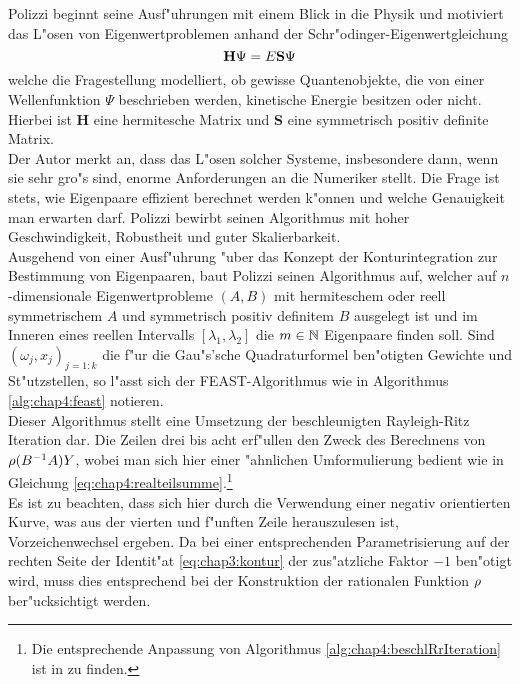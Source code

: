 Polizzi beginnt seine Ausf"uhrungen mit einem Blick in die Physik und motiviert das L"osen von Eigenwertproblemen anhand der Schr"odinger-Eigenwertgleichung
\[
\textbf{\text{H}}\Psi = E\textbf{\text{S}}\Psi
\]
welche die Fragestellung modelliert, ob gewisse Quantenobjekte, die von einer Wellenfunktion $\Psi$ beschrieben werden, kinetische Energie besitzen oder nicht. Hierbei ist \textbf{H} eine hermitesche Matrix und \textbf{S} eine symmetrisch positiv definite Matrix.\\

Der Autor merkt an, dass das L"osen solcher Systeme, insbesondere dann, wenn sie sehr gro"s sind, enorme Anforderungen an die Numeriker stellt. Die Frage ist stets, wie Eigenpaare effizient berechnet werden k"onnen und welche Genauigkeit man erwarten darf. Polizzi bewirbt seinen Algorithmus mit hoher Geschwindigkeit, Robustheit und guter Skalierbarkeit.\\ %

Ausgehend von einer Ausf"uhrung "uber das Konzept der Konturintegration zur Bestimmung von Eigenpaaren, baut Polizzi seinen Algorithmus auf, welcher auf $n$-dimensionale Eigenwertprobleme $(A,B)$ mit hermiteschem oder reell symmetrischem $A$ und symmetrisch positiv definitem $B$ ausgelegt ist und im Inneren eines reellen Intervalls $[\lambda_1,\lambda_2]$ die $m\in\mathbb{N}$ Eigenpaare finden soll.
Sind $(\omega_j, x_j)_{j=1:k}$ die f"ur die Gau"s'sche Quadraturformel ben"otigten Gewichte und St"utzstellen, so l"asst sich der FEAST-Algorithmus wie in Algorithmus \ref{alg:chap4:feast} notieren.\\

Dieser Algorithmus stellt eine Umsetzung der beschleunigten Rayleigh-Ritz Iteration dar. Die Zeilen drei bis acht erf"ullen den Zweck des Berechnens von $\rho(B^{-1}A)Y$, wobei man sich hier einer "ahnlichen Umformulierung bedient wie in Gleichung \eqref{eq:chap4:realteilsumme}.\footnote{Die entsprechende Anpassung von Algorithmus \ref{alg:chap4:beschlRrIteration} ist in \cite[365]{ptep} zu finden.}\\

Es ist zu beachten, dass sich hier durch die Verwendung einer negativ orientierten Kurve, was aus der vierten und f"unften Zeile herauszulesen ist, Vorzeichenwechsel ergeben. Da bei einer entsprechenden Parametrisierung auf der rechten Seite der Identit"at \eqref{eq:chap3:kontur} der zus"atzliche Faktor $-1$ ben"otigt wird, muss dies entsprechend bei der Konstruktion der rationalen Funktion $\rho$ ber"ucksichtigt werden.

